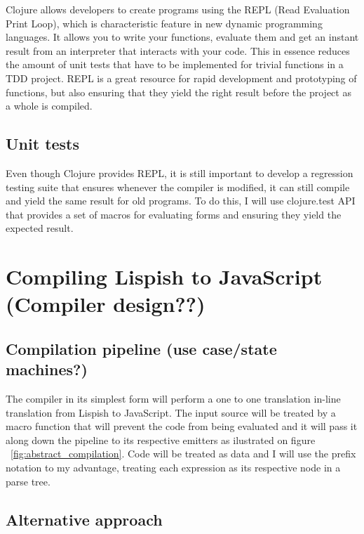 Clojure allows developers to create programs using the REPL (Read Evaluation Print Loop), which is characteristic feature in new dynamic programming languages. It allows you to write your functions, evaluate them and get an instant result from an interpreter that interacts with your code. This in essence reduces the amount of unit tests that have to be implemented for trivial functions in a TDD project. 
REPL is a great resource for rapid development and prototyping of functions, but also ensuring that they yield the right result before the project as a whole is compiled.

\subsection{Unit tests}
Even though Clojure provides REPL, it is still important to develop a regression testing suite that ensures whenever the compiler is modified, it can still compile and yield the same result for old programs.
To do this, I will use clojure.test API that provides a set of macros for evaluating forms and ensuring they yield the expected result. 

\section{Compiling Lispish to JavaScript (Compiler design??)}

\subsection{Compilation pipeline (use case/state machines?)}



The compiler in its simplest form will perform a one to one translation in-line translation from Lispish to JavaScript. 
The input source will be treated by a macro function that will prevent the code from being evaluated and it will pass it along down the pipeline to its respective emitters as ilustrated on figure ~\ref{fig:abstract_compilation}. Code will be treated as data and I will use the prefix notation to my advantage, treating each expression as its respective node in a parse tree. 

\subsection{Alternative approach}
